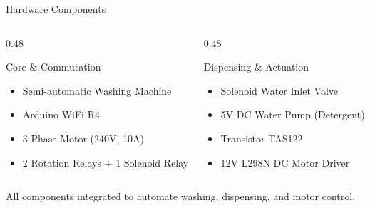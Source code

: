 \documentclass[aspectratio=169]{beamer}
\begin{document}
\begin{frame}{Hardware Components}
\begin{columns}[T]
\begin{column}{0.48\textwidth}
\begin{block}{Core \& Commutation}
\begin{itemize}
    \item Semi-automatic Washing Machine
    \item Arduino WiFi R4
    \item 3-Phase Motor (240V, 10A)
    \item 2 Rotation Relays + 1 Solenoid Relay
\end{itemize}
\end{block}
\end{column}
\begin{column}{0.48\textwidth}
\begin{block}{Dispensing \& Actuation}
\begin{itemize}
    \item Solenoid Water Inlet Valve
    \item 5V DC Water Pump (Detergent)
    \item Transistor TAS122
    \item 12V L298N DC Motor Driver
\end{itemize}
\end{block}
\end{column}
\end{columns}
\vspace{0.3cm}
\centering
\small All components integrated to automate washing, dispensing, and motor control.
\end{frame}
\end{document}
